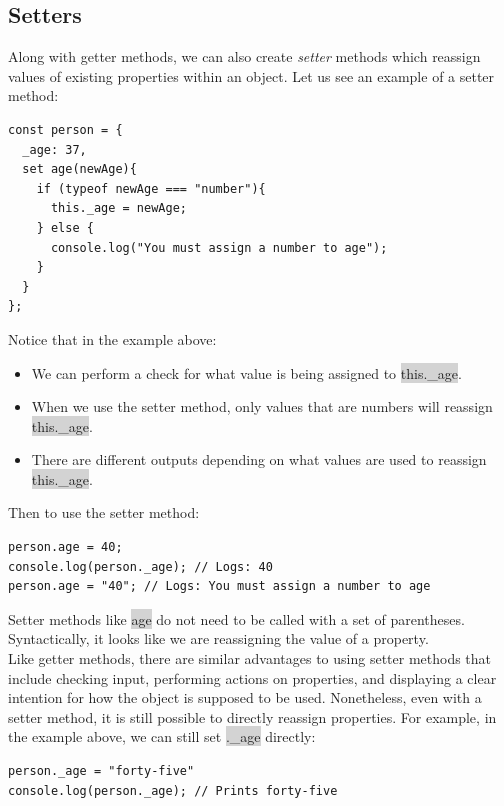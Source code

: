 \documentclass[11pt]{article}
\begin{document}
\subsection{Setters}
Along with getter methods, we can also create \textit{setter} methods which reassign values of existing properties within an object. Let us see an example of a setter method:
\begin{lstlisting}
const person = {
  _age: 37,
  set age(newAge){
    if (typeof newAge === "number"){
      this._age = newAge;
    } else {
      console.log("You must assign a number to age");
    }
  }
};
\end{lstlisting}
Notice that in the example above:
\begin{itemize}[leftmargin = *]
\item We can perform a check for what value is being assigned to \colorbox{lightgray}{this.\_age}.
\item When we use the setter method, only values that are numbers will reassign \colorbox{lightgray}{this.\_age}.
\item There are different outputs depending on what values are used to reassign \colorbox{lightgray}{this.\_age}.
\end{itemize}
Then to use the setter method:
\begin{lstlisting}
person.age = 40;
console.log(person._age); // Logs: 40
person.age = "40"; // Logs: You must assign a number to age
\end{lstlisting}
Setter methods like \colorbox{lightgray}{age} do not need to be called with a set of parentheses. Syntactically, it looks like we are reassigning the value of a property. \\
\newline
Like getter methods, there are similar advantages to using setter methods that include checking input, performing actions on properties, and displaying a clear intention for how the object is supposed to be used. Nonetheless, even with a setter method, it is still possible to directly reassign properties. For example, in the example above, we can still set \colorbox{lightgray}{.\_age} directly: 
\begin{lstlisting}
person._age = "forty-five"
console.log(person._age); // Prints forty-five
\end{lstlisting}
\end{document}
